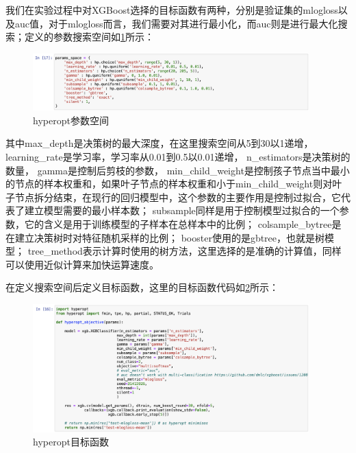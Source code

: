 我们在实验过程中对XGBoost选择的目标函数有两种，分别是验证集的mlogloss以及auc值，对于mlogloss而言，我们需要对其进行最小化，而auc则是进行最大化搜索；定义的参数搜索空间如\ref{hyperopt-param-space}所示：
\begin{figure}[htb]
  \vspace{13pt} %
  \centering
  \includegraphics[width=0.95\textwidth]{images/XGBoost-hyperopt-param-space.png}
  \caption{hyperopt参数空间}\label{hyperopt-param-space} %
\end{figure}

\newpage
其中max\_depth是决策树的最大深度，在这里搜索空间从5到30以1递增，
learning\_rate是学习率，学习率从0.01到0.5以0.01递增，
n\_estimators是决策树的数量，
gamma是控制后剪枝的参数，
min\_child\_weight是控制孩子节点当中最小的节点的样本权重和，如果叶子节点的样本权重和小于min\_child\_weight则对叶子节点拆分结束，在现行的回归模型中，这个参数的主要作用是控制过拟合，它代表了建立模型需要的最小样本数；
subsample同样是用于控制模型过拟合的一个参数，它的含义是用于训练模型的子样本在总样本中的比例；
colsample\_bytree是在建立决策树时对特征随机采样的比例；
booster使用的是gbtree，也就是树模型；
tree\_method表示计算时使用的树方法，这里选择的是准确的计算值，同样可以使用近似计算来加快运算速度。

在定义搜索空间后定义目标函数，这里的目标函数代码如\ref{hyperopt-objective-function}所示：
\begin{figure}[htb]
  \vspace{13pt} %
  \centering
  \includegraphics[width=0.95\textwidth]{images/XGBoost-hyperopt-objective-function.png}
  \caption{hyperopt目标函数}\label{hyperopt-objective-function} %
\end{figure}

